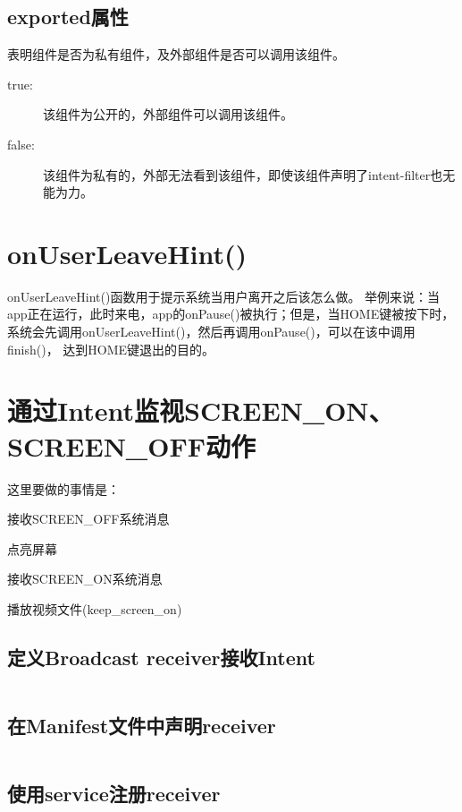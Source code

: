 ﻿\documentclass[a4paper,11pt]{article}
\begin{document}
  \subsection[exported属性]{exported属性}
  表明组件是否为私有组件，及外部组件是否可以调用该组件。
  \begin{description}
    \item[true:] 该组件为公开的，外部组件可以调用该组件。
    \item[false:] 该组件为私有的，外部无法看到该组件，即使该组件声明了intent-filter也无能为力。
  \end{description}

  \section[onUserLeaveHint()]{onUserLeaveHint()}
  onUserLeaveHint()函数用于提示系统当用户离开之后该怎么做。
  举例来说：当app正在运行，此时来电，app的onPause()被执行；但是，当HOME键被按下时，
  系统会先调用onUserLeaveHint()，然后再调用onPause()，可以在该中调用finish()，
  达到HOME键退出的目的。

  \section[通过Intent监视SCREEN\_ON、SCREEN\_OFF动作]{通过Intent监视SCREEN\_ON、SCREEN\_OFF动作}
  这里要做的事情是：
  \begin{coloredenumerate}
    \item 接收SCREEN\_OFF系统消息
    \item 点亮屏幕
    \item 接收SCREEN\_ON系统消息
    \item 播放视频文件(keep\_screen\_on)
  \end{coloredenumerate}
  \subsection[定义Broadcast receiver接收Intent]{定义Broadcast receiver接收Intent}
  \inputminted[linenos,tabsize=4,bgcolor=srcbg,fontsize=\small]{java}{srcdir/ScreenBroadcastReceiver.java}

  \subsection[在Manifest文件中声明receiver]{在Manifest文件中声明receiver}
  \inputminted[linenos,tabsize=4,bgcolor=srcbg]{xml}{srcdir/AndroidManifest.xml}

  \subsection[使用service注册receiver]{使用service注册receiver}
  \inputminted[linenos,tabsize=4,bgcolor=srcbg]{java}{srcdir/ReceiverService.java}
\end{document}
